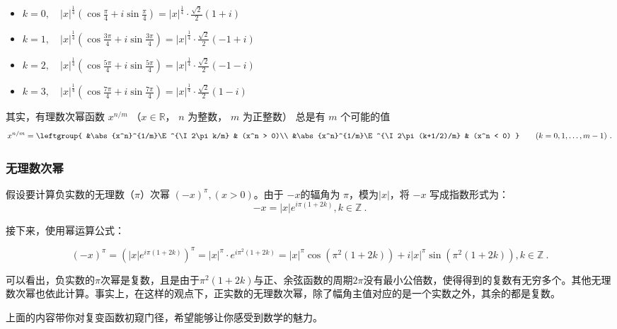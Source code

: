 \begin{itemize}
\item $\displaystyle k = 0,\quad |x|^{\frac{1}{4}} \left( \cos\frac{\pi}{4} + i\sin\frac{\pi}{4} \right) = |x|^{\frac{1}{4}} \cdot \frac{\sqrt{2}}{2} \left( 1 + i \right)$
\item $\displaystyle k = 1,\quad |x|^{\frac{1}{4}} \left( \cos\frac{3\pi}{4} + i\sin\frac{3\pi}{4} \right) = |x|^{\frac{1}{4}} \cdot \frac{\sqrt{2}}{2} \left( -1 +i \right)$
\item $\displaystyle k = 2,\quad |x|^{\frac{1}{4}} \left( \cos\frac{5\pi}{4} + i\sin\frac{5\pi}{4} \right) = |x|^{\frac{1}{4}} \cdot \frac{\sqrt{2}}{2} \left( -1 - i \right)$
\item $\displaystyle k = 3,\quad |x|^{\frac{1}{4}} \left( \cos\frac{7\pi}{4} + i\sin\frac{7\pi}{4} \right) = |x|^{\frac{1}{4}} \cdot \frac{\sqrt{2}}{2} \left( 1 - i \right)$
\end{itemize}

其实，有理数次幂函数 $x^{n/m}$ （$x\in \mathbb R$， $n$ 为整数， $m$ 为正整数） 总是有 $m$ 个可能的值
\begin{equation}
x^{n/m} = \leftgroup{
&\abs{x^n}^{1/m}\E^{\I 2\pi k/m} & (x^n > 0)\\
&\abs{x^n}^{1/m}\E^{\I 2\pi (k+1/2)/m} & (x^n < 0)
}\qquad (k = 0,1,\dots, m-1)~.
\end{equation}

\subsubsection{无理数次幂}

假设要计算负实数的无理数（$\pi$）次幂 $(-x)^\pi,(x>0)$。由于 $-x$的辐角为 $\pi$，模为$|x|$，将 $-x$ 写成指数形式为：
\begin{equation}
-x = |x| e^{i\pi(1+2k)},k\in\mathbb{Z}~.
\end{equation}

接下来，使用幂运算公式：

\begin{equation}
(-x)^\pi = \left( |x| e^{i\pi(1+2k)} \right)^\pi =|x|^\pi \cdot e^{i\pi^2(1+2k)}=|x|^\pi\cos(\pi^2(1+2k)) + i|x|^\pi\sin(\pi^2(1+2k)),k\in\mathbb{Z}~.
\end{equation}

可以看出，负实数的$\pi$次幂是复数，且是由于$\pi^2(1+2k)$与正、余弦函数的周期$2\pi$没有最小公倍数，使得得到的复数有无穷多个。其他无理数次幂也依此计算。事实上，在这样的观点下，正实数的无理数次幂，除了幅角主值对应的是一个实数之外，其余的都是复数。

上面的内容带你对复变函数初窥门径，希望能够让你感受到数学的魅力。